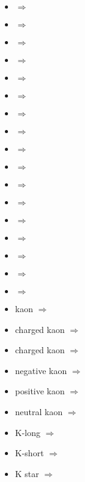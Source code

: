 \begin{multicols}{2}{
\begin{itemize}
\item  {} $\Rightarrow$ \PB
\item  {} $\Rightarrow$ \PBpm
\item  {} $\Rightarrow$ \PBmp
\item  {} $\Rightarrow$ \PBp
\item  {} $\Rightarrow$ \PBm
\item  {} $\Rightarrow$ \PBz
\item  {} $\Rightarrow$ \PBst
\item  {} $\Rightarrow$ \PdB
\item  {} $\Rightarrow$ \PuB
\item  {} $\Rightarrow$ \PcB
\item  {} $\Rightarrow$ \PsB
\item  {} $\Rightarrow$ \PaB
\item  {} $\Rightarrow$ \PaBz
\item  {} $\Rightarrow$ \PadB
\item  {} $\Rightarrow$ \PauB
\item  {} $\Rightarrow$ \PacB
\item  {} $\Rightarrow$ \PasB
\item kaon\newline {} $\Rightarrow$ \PK
\item charged kaon\newline {} $\Rightarrow$ \PKpm
\item charged kaon\newline {} $\Rightarrow$ \PKmp
\item negative kaon\newline {} $\Rightarrow$ \PKm
\item positive kaon\newline {} $\Rightarrow$ \PKp
\item neutral kaon\newline {} $\Rightarrow$ \PKz
\item K-long\newline {} $\Rightarrow$ \PKzL
\item K-short\newline {} $\Rightarrow$ \PKzS
\item K star\newline {} $\Rightarrow$ \PKst

\end{itemize}}
\end{multicols}
